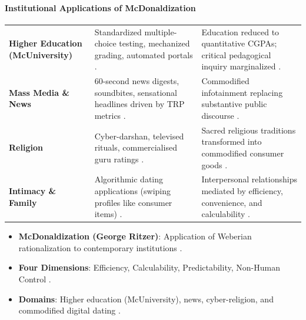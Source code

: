 \paragraph{Institutional Applications of McDonaldization}

\begin{table}[htbp]
\centering
\begin{tabularx}{\textwidth}{p{3.2cm} Y Y}
\hline
{}
 &  &  \\
\hline
\textbf{Higher Education (McUniversity)} & Standardized multiple-choice testing, mechanized grading, automated portals . & Education reduced to quantitative CGPAs; critical pedagogical inquiry marginalized . \\
\textbf{Mass Media \& News} & 60-second news digests, soundbites, sensational headlines driven by TRP metrics . & Commodified infotainment replacing substantive public discourse . \\
\textbf{Religion} & Cyber-darshan, televised rituals, commercialised guru ratings . & Sacred religious traditions transformed into commodified consumer goods . \\
\textbf{Intimacy \& Family} & Algorithmic dating applications (swiping profiles like consumer items) . & Interpersonal relationships mediated by efficiency, convenience, and calculability . \\
\hline
\end{tabularx}
\end{table}

\begin{QuickRevision}
\begin{itemize}
    \item \textbf{McDonaldization (George Ritzer)}: Application of Weberian rationalization to contemporary institutions .
    \item \textbf{Four Dimensions}: Efficiency, Calculability, Predictability, Non-Human Control .
    \item \textbf{Domains}: Higher education (McUniversity), news, cyber-religion, and commodified digital dating .
\end{itemize}
\end{QuickRevision}

\sectiondivider


